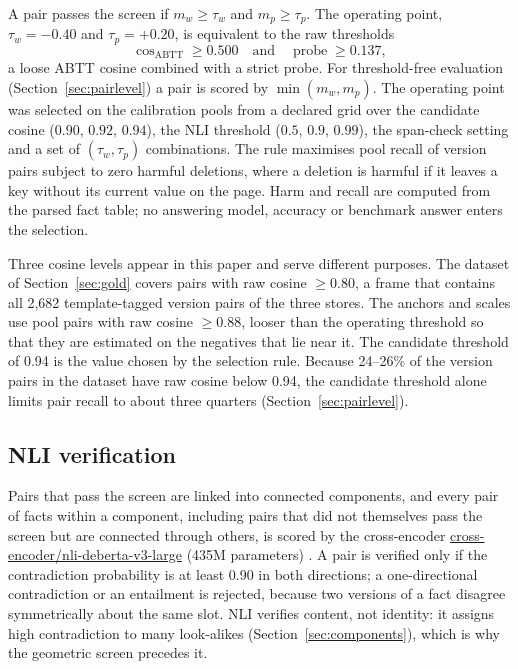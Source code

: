 \documentclass[journal=jcisd8,manuscript=article]{achemso}
\begin{document}
A pair passes the screen if $m_w\ge\tau_w$ and $m_p\ge\tau_p$. The operating point, $\tau_w=-0.40$ and $\tau_p=+0.20$, is equivalent to the raw thresholds
\begin{equation}
\cos_{\mathrm{ABTT}}\ge0.500\quad\text{and}\quad\operatorname{probe}\ge0.137,
\end{equation}
a loose ABTT cosine combined with a strict probe. For threshold-free evaluation (Section~\ref{sec:pairlevel}) a pair is scored by $\min(m_w,m_p)$. The operating point was selected on the calibration pools from a declared grid over the candidate cosine ($0.90$, $0.92$, $0.94$), the NLI threshold ($0.5$, $0.9$, $0.99$), the span-check setting and a set of $(\tau_w,\tau_p)$ combinations. The rule maximises pool recall of version pairs subject to zero harmful deletions, where a deletion is harmful if it leaves a key without its current value on the page. Harm and recall are computed from the parsed fact table; no answering model, accuracy or benchmark answer enters the selection.

Three cosine levels appear in this paper and serve different purposes. The dataset of Section~\ref{sec:gold} covers pairs with raw cosine $\ge0.80$, a frame that contains all 2,682 template-tagged version pairs of the three stores. The anchors and scales use pool pairs with raw cosine $\ge0.88$, looser than the operating threshold so that they are estimated on the negatives that lie near it. The candidate threshold of 0.94 is the value chosen by the selection rule. Because 24--26\% of the version pairs in the dataset have raw cosine below 0.94, the candidate threshold alone limits pair recall to about three quarters (Section~\ref{sec:pairlevel}).

\subsection{NLI verification}
\label{sec:nli}

Pairs that pass the screen are linked into connected components, and every pair of facts within a component, including pairs that did not themselves pass the screen but are connected through others, is scored by the cross-encoder \url{cross-encoder/nli-deberta-v3-large} (435M parameters) \cite{he2023debertav3}. A pair is verified only if the contradiction probability is at least 0.90 in both directions; a one-directional contradiction or an entailment is rejected, because two versions of a fact disagree symmetrically about the same slot. NLI verifies content, not identity: it assigns high contradiction to many look-alikes (Section~\ref{sec:components}), which is why the geometric screen precedes it.
\end{document}
